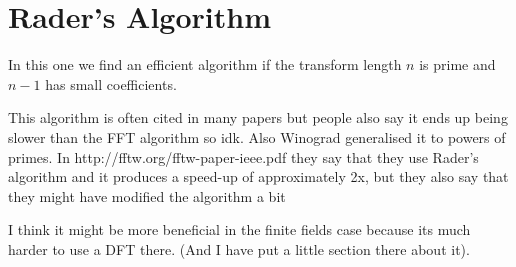 \section{Rader's Algorithm}%
\label{sec:Rader's Algorithm}

In this one we find an efficient algorithm if the transform length $n$ is prime and $n - 1$ has small coefficients.

This algorithm is often cited in many papers but people also say it ends up being slower than the FFT algorithm so idk. Also Winograd generalised it to powers of primes. In http://fftw.org/fftw-paper-ieee.pdf they say that they use Rader's algorithm and it produces a speed-up of approximately 2x, but they also say that they might have modified the algorithm a bit

I think it might be more beneficial in the finite fields case because its much harder to use a DFT there. (And I have put a little section there about it).
